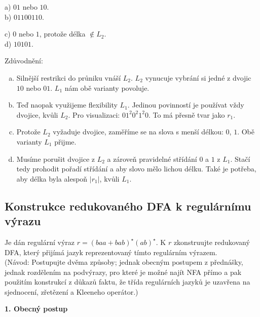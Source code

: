 \begin{multicols}{2}
    a) $01$ nebo $10$.\\
    b) $01100110$.
\columnbreak

    c) $0$ nebo $1$, protože délka $\not\in L_2$.\\
    d) $10101$.
\end{multicols}
Zdůvodnění:
\begin{enumerate}[a), noitemsep]
    \item Silnější restrikci do průniku vnáší $L_2$. $L_2$ vynucuje vybrání si jedné z dvojic $10$ nebo $01$. $L_1$ nám 
    obě varianty povoluje.
    \item Teď naopak využijeme flexibility $L_1$. Jedinou povinností je používat vždy dvojice, kvůli $L_2$. Pro 
    visualizaci: $0 1^2 0^2 1^2 0$. To má přesně tvar jako $r_1$.
    \item Protože $L_2$ vyžaduje dvojice, zaměříme se na slova s menší délkou: $0$, $1$. Obě varianty $L_1$ přijme.
    \item Musíme porušit dvojice z $L_2$ a zároveň pravidelné střídání $0$ a $1$ z $L_1$. Stačí tedy prohodit pořadí 
    střídání a aby slovo mělo lichou délku. Také je potřeba, aby délka byla alespoň $|r_1|$, kvůli $L_1$. 
\end{enumerate}

\subsection{Konstrukce redukovaného DFA k regulárnímu výrazu}
Je dán regulární výraz $r=(baa + bab)^\star (ab)^\star$. K $r$ zkonstruujte redukovaný DFA, který přijímá jazyk 
reprezentovaný tímto regulárním výrazem.\\
(Návod: Postupujte dvěma způsoby; jednak obecným postupem z přednášky, jednak rozdělením na podvýrazy, pro které je možné
najít NFA přímo a pak použitím konstrukcí z důkazů faktu, že třída regulárních jazyků je uzavřena na sjednocení, zřetězení
a Kleeneho operátor.)

\newpage
\textbf{1. Obecný postup}

